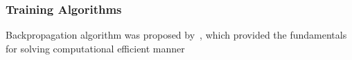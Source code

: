\subsubsection{Training Algorithms}
Backpropagation algorithm was proposed by~\citet{werbos1975beyond}, which provided the fundamentals for solving computational efficient manner